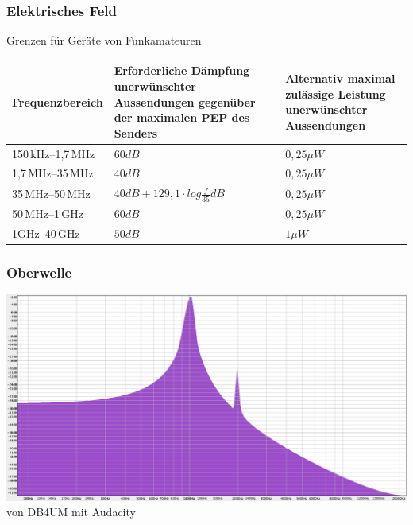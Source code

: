 \begin{frame}
  \frametitle{Elektrisches Feld}
  \begin{center}
    \begin{block}{Grenzen für Geräte von Funkamateuren}
      \begin{tabular}{p{}|p{}|p{}}
        Frequenzbereich & Erforderliche Dämpfung unerwünschter Aussendungen gegenüber der maximalen PEP des Senders & Alternativ maximal zulässige Leistung unerwünschter Aussendungen \\ \hline \hline
        150\,kHz--1,7\,MHz & $60dB$ & $0,25 \mu W$ \\ \hline
        1,7\,MHz--35\,MHz & $40dB$ & $0,25 \mu W$ \\ \hline
        35\,MHz--50\,MHz & $40dB + 129,1 \cdot log \frac{f}{35}dB $ & $0,25 \mu W$ \\ \hline
        50\,MHz--1\,GHz & $60dB$ & $0,25 \mu W$ \\ \hline
        1GHz--40\,GHz & $50dB$ & $1 \mu W$
      \end{tabular}
    \end{block}
  \end{center}
\end{frame}

\begin{frame}
  \frametitle{Oberwelle}
  \begin{center}
    \includegraphics[width=1\textwidth,height=.80\textheight,keepaspectratio]{a19/oberwelle.png}\\
    {\tiny von DB4UM mit Audacity}
  \end{center}
\end{frame}

